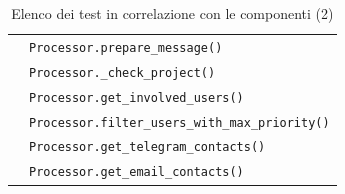 \begin{table}[H]
{\begin{tabularx}{0.65\textwidth}{cX}
				\addtotu & \texttt{Processor.prepare\_message()} \\
				\addtotu & \texttt{Processor.\_check\_project()} \\
				\addtotu & \texttt{Processor.get\_involved\_users()} \\
				\addtotu & \texttt{Processor.filter\_users\_with\_max\_priority()} \\
				\addtotu & \texttt{Processor.get\_telegram\_contacts()} \\
				\addtotu & \texttt{Processor.get\_email\_contacts()} \\
				\bottomrule
			\end{tabularx}}
			\caption{Elenco dei test in correlazione con le componenti (2)}
		\end{table}
